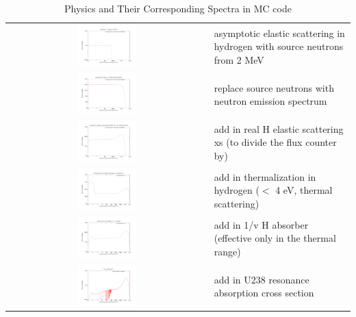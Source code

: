 \documentclass{school-22.211-notes}
\begin{document}
\begin{table}
  \centering
  \begin{tabular}[h]{cl}
    \includegraphics[width=0.3\textwidth]{images/sl-d/spec-1.uncrop.pdf} & asymptotic elastic scattering in hydrogen with source neutrons from 2 MeV \\ 
    \includegraphics[width=0.3\textwidth]{images/sl-d/spec-2.uncrop.pdf} & replace source neutrons with neutron emission spectrum \\
    \includegraphics[width=0.3\textwidth]{images/sl-d/spec-3.uncrop.pdf} & add in real H elastic scattering xs (to divide the flux counter by) \\
    \includegraphics[width=0.3\textwidth]{images/sl-d/spec-4.uncrop.pdf} & add in thermalization in hydrogen ($<$ 4 eV, thermal scattering) \\
    \includegraphics[width=0.3\textwidth]{images/sl-d/spec-5.uncrop.pdf} & add in 1/v H absorber (effective only in the thermal range) \\
    \includegraphics[width=0.3\textwidth]{images/sl-d/spec-7.uncrop.pdf} & add in U238 resonance absorption cross section \\
  \end{tabular}
  \caption{Physics and Their Corresponding Spectra in MC code} \label{plot-MC}
\end{table}
\end{document}
